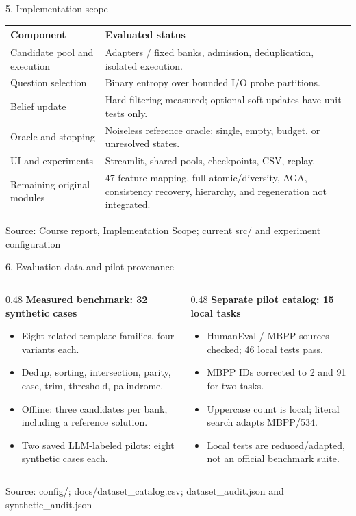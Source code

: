 \documentclass[aspectratio=169,10pt]{beamer}
\newcommand{\source}[1]{\par\vfill{\scriptsize\color{gray}Source: #1\par}}
\begin{document}
\begin{frame}{5. Implementation scope}
  \renewcommand{\arraystretch}{1.25}
  \begin{tabularx}{\textwidth}{@{}p{}X@{}}
    \toprule
    \textbf{Component} & \textbf{Evaluated status}\\ \midrule
    Candidate pool and execution & Adapters / fixed banks, admission, deduplication, isolated execution.\\
    Question selection & Binary entropy over bounded I/O probe partitions.\\
    Belief update & Hard filtering measured; optional soft updates have unit tests only.\\
    Oracle and stopping & Noiseless reference oracle; single, empty, budget, or unresolved states.\\
    UI and experiments & Streamlit, shared pools, checkpoints, CSV, replay.\\
    Remaining original modules & 47-feature mapping, full atomic/diversity, AGA, consistency recovery, hierarchy, and regeneration not integrated.\\
    \bottomrule
  \end{tabularx}
  \source{Course report, Implementation Scope; current src/ and experiment configuration}
\end{frame}

\begin{frame}{6. Evaluation data and pilot provenance}
  \begin{columns}[T]
    \begin{column}{0.48\textwidth}
      \textbf{Measured benchmark: 32 synthetic cases}
      \begin{itemize}
        \item Eight related template families, four variants each.
        \item Dedup, sorting, intersection, parity, case, trim, threshold, palindrome.
        \item Offline: three candidates per bank, including a reference solution.
        \item Two saved LLM-labeled pilots: eight synthetic cases each.
      \end{itemize}
    \end{column}
    \begin{column}{0.48\textwidth}
      \textbf{Separate pilot catalog: 15 local tasks}
      \begin{itemize}
        \item HumanEval / MBPP sources checked; 46 local tests pass.
        \item MBPP IDs corrected to 2 and 91 for two tasks.
        \item Uppercase count is local; literal search adapts MBPP/534.
        \item Local tests are reduced/adapted, not an official benchmark suite.
      \end{itemize}
    \end{column}
  \end{columns}
  \source{config/; docs/dataset\_catalog.csv; dataset\_audit.json and synthetic\_audit.json}
\end{frame}
\end{document}
